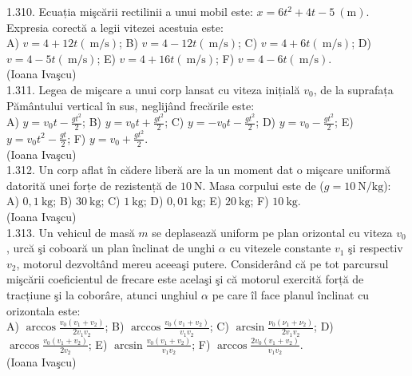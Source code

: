 1.310. Ecuația mişcării rectilinii a unui mobil este: $x=6 t^{2}+4 t-5 \mathrm{~(m)}$. Expresia corectă a legii vitezei acestuia este:\\ A) $v=4+12 t(\mathrm{~m} / \mathrm{s})$; B) $v=4-12 t(\mathrm{~m} / \mathrm{s})$; C) $v=4+6 t(\mathrm{~m} / \mathrm{s})$; D) $v=4-5 t(\mathrm{~m} / \mathrm{s})$; E) $v=4+16 t(\mathrm{~m} / \mathrm{s})$; F) $v=4-6 t(\mathrm{~m} / \mathrm{s})$.\\ (Ioana Ivaşcu)\\

1.311. Legea de mişcare a unui corp lansat cu viteza inițială $v_{0}$, de la suprafața Pământului vertical în sus, neglijând frecările este:\\ A) $y=v_{0} t-\frac{g t^{2}}{2}$; B) $y=v_{0} t+\frac{g t^{2}}{2}$; C) $y=-v_{0} t-\frac{g t^{2}}{2}$; D) $y=v_{0}-\frac{g t^{2}}{2}$; E) $y=v_{0} t^{2}-\frac{g t}{2}$; F) $y=v_{0}+\frac{g t^{2}}{2}$.\\ (Ioana Ivaşcu)\\

1.312. Un corp aflat în cădere liberă are la un moment dat o mişcare uniformă datorită unei forțe de rezistență de $10 \mathrm{~N}$. Masa corpului este de ($g=10 \mathrm{~N} / \mathrm{kg}$):\\ A) $0,1 \mathrm{~kg}$; B) $30 \mathrm{~kg}$; C) $1 \mathrm{~kg}$; D) $0,01 \mathrm{~kg}$; E) $20 \mathrm{~kg}$; F) $10 \mathrm{~kg}$.\\ (Ioana Ivaşcu)\\

1.313. Un vehicul de masă $m$ se deplasează uniform pe plan orizontal cu viteza $v_{0}$, urcă şi coboară un plan înclinat de unghi $\alpha$ cu vitezele constante $v_{1}$ şi respectiv $v_{2}$, motorul dezvoltând mereu aceeaşi putere. Considerând că pe tot parcursul mişcării coeficientul de frecare este acelaşi şi că motorul exercită forță de tracțiune şi la coborâre, atunci unghiul $\alpha$ pe care îl face planul înclinat cu orizontala este:\\ A) $\arccos \frac{v_{0}\left(v_{1}+v_{2}\right)}{2 v_{1} v_{2}}$; B) $\arccos \frac{v_{0}\left(v_{1}+v_{2}\right)}{v_{1} v_{2}}$; C) $\arcsin \frac{\nu_{0}\left(\nu_{1}+\nu_{2}\right)}{2 v_{1} v_{2}}$; D) $\arccos \frac{v_{0}\left(v_{1}+v_{2}\right)}{2 v_{2}}$; E) $\arcsin \frac{v_{0}\left(v_{1}+v_{2}\right)}{v_{1} v_{2}}$; F) $\arccos \frac{2 v_{0}\left(v_{1}+v_{2}\right)}{v_{1} v_{2}}$.\\ (Ioana Ivaşcu)\\

